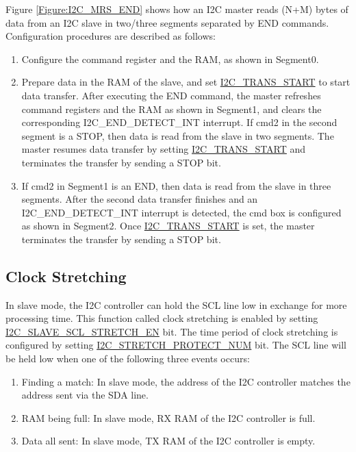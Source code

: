 \documentclass[main\_\_EN.tex]{subfiles}
\begin{document}
Figure \ref{Figure:I2C_MRS_END} shows how an I2C master reads (N+M) bytes of data from an I2C slave in two/three segments separated by END commands. Configuration procedures are described as follows:
\begin{enumerate}
    \item Configure the command register and the RAM, as shown in Segment0.
    \item Prepare data in the RAM of the slave, and set \hyperref[fielddesc:I2CTRANSSTART]{I2C\_TRANS\_START} to start data transfer. After executing the END command, the master refreshes command registers and the RAM as shown in Segment1, and clears the corresponding I2C\_END\_DETECT\_INT interrupt. If cmd2 in the second segment is a STOP, then data is read from the slave in two segments. The master resumes data transfer by setting \hyperref[fielddesc:I2CTRANSSTART]{I2C\_TRANS\_START} and terminates the transfer by sending a STOP bit.
    \item If cmd2 in Segment1 is an END, then data is read from the slave in three segments. After the second data transfer finishes and an I2C\_END\_DETECT\_INT interrupt is detected, the cmd box is configured as shown in Segment2. Once \hyperref[fielddesc:I2CTRANSSTART]{I2C\_TRANS\_START} is set, the master terminates the transfer by sending a STOP bit.
\end{enumerate}

\subsection {Clock Stretching}
In slave mode, the I2C controller can hold the SCL line low in exchange for more processing time. This function called clock stretching is enabled by setting \hyperref[fielddesc:I2CSLAVESCLSTRETCHEN]{I2C\_SLAVE\_SCL\_STRETCH\_EN} bit. The time period of clock stretching is configured by setting \hyperref[fielddesc:I2CSTRETCHPROTECTNUM]{I2C\_STRETCH\_PROTECT\_NUM} bit.
The SCL line will be held low when one of the following three events occurs:
\begin{enumerate}
\item Finding a match: In slave mode, the address of the I2C controller matches the address sent via the SDA line.
\item RAM being full: In slave mode, RX RAM of the I2C controller is full.
\item Data all sent: In slave mode, TX RAM of the I2C controller is empty.
\end{enumerate}
\end{document}
